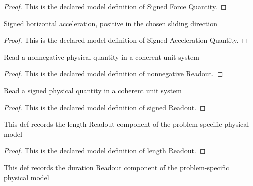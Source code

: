 \begin{proof}
  This is the declared model definition of Signed Force Quantity.
\end{proof}
\begin{definition}
  \label{def:physics:phyx-mini-0976:phyxminiproblems-problemphyxmini0976-signedaccelerationquantity}
  Signed horizontal acceleration, positive in the chosen sliding direction
\end{definition}
\begin{proof}
  This is the declared model definition of Signed Acceleration Quantity.
\end{proof}
\begin{definition}
  \label{def:physics:phyx-mini-0976:phyxminiproblems-problemphyxmini0976-nonnegativereadout}
  Read a nonnegative physical quantity in a coherent unit system
\end{definition}
\begin{proof}
  This is the declared model definition of nonnegative Readout.
\end{proof}
\begin{definition}
  \label{def:physics:phyx-mini-0976:phyxminiproblems-problemphyxmini0976-signedreadout}
  Read a signed physical quantity in a coherent unit system
\end{definition}
\begin{proof}
  This is the declared model definition of signed Readout.
\end{proof}
\begin{definition}
  \label{def:physics:phyx-mini-0976:phyxminiproblems-problemphyxmini0976-lengthreadout}
  This def records the length Readout component of the problem-specific physical model
\end{definition}
\begin{proof}
  This is the declared model definition of length Readout.
\end{proof}
\begin{definition}
  \label{def:physics:phyx-mini-0976:phyxminiproblems-problemphyxmini0976-durationreadout}
  This def records the duration Readout component of the problem-specific physical model
\end{definition}
